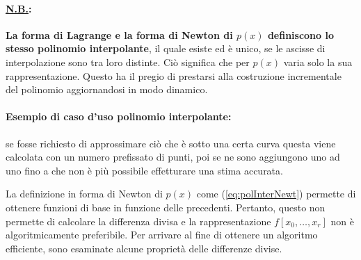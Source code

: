 \paragraph{\ul{N.B.}:} \textbf{La forma di Lagrange e la forma di Newton di $p(x)$ definiscono lo stesso polinomio interpolante}, il quale esiste ed è unico, se le ascisse di interpolazione sono tra loro distinte. Ciò significa che per $p(x)$ varia solo la sua rappresentazione. Questo ha il pregio di prestarsi alla costruzione incrementale del polinomio aggiornandosi in modo dinamico.

\paragraph{Esempio di caso d'uso polinomio interpolante:} se fosse richiesto di approssimare ciò che è sotto una certa curva questa viene calcolata con un numero prefissato di punti, poi se ne sono aggiungono uno ad uno fino a che non è più possibile effetturare una stima accurata.

La definizione in forma di Newton di $p(x)$ come (\ref{eq:polInterNewt}) permette di ottenere funzioni di base in funzione delle precedenti. Pertanto, questo non permette di calcolare la differenza divisa e la rappresentazione $f[x_0,\hdots, x_r]$ non è algoritmicamente preferibile. Per arrivare al fine di ottenere un algoritmo efficiente, sono esaminate alcune proprietà delle differenze divise.

